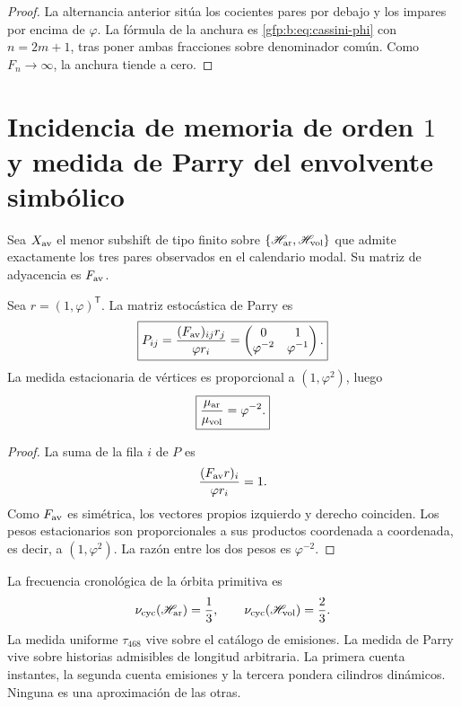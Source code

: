 \begin{proof}
La alternancia anterior sitúa los cocientes pares por debajo y los impares
por encima de \(\varphi\). La fórmula de la anchura es
\eqref{gfp:b:eq:cassini-phi} con \(n=2m+1\), tras poner ambas fracciones sobre
denominador común. Como \(F_n\to\infty\), la anchura tiende a cero.
\end{proof}

\section{Incidencia de memoria de orden \(1\) y medida de Parry del envolvente simbólico}

Sea \(X_{\rm av}\) el menor subshift de tipo finito sobre
\(\{\mathscr H_{\rm ar},\mathscr H_{\rm vol}\}\) que admite exactamente
los tres pares observados en el calendario modal. Su matriz de adyacencia es
\(F_{\rm av}\).

\begin{theorem}
\label{gfp:b:thm:parry-phi}
Sea \(r=(1,\varphi)^{\mathsf T}\). La matriz estocástica de Parry es
\begin{equation}
 \boxed{
 P_{ij}=
 \frac{(F_{\rm av})_{ij}r_j}{\varphi r_i}
 =
 \begin{pmatrix}
 0&1\\
 \varphi^{-2}&\varphi^{-1}
 \end{pmatrix}.}
 \label{gfp:b:eq:parry-matriz-phi}
\end{equation}
La medida estacionaria de vértices es proporcional a
\((1,\varphi^2)\), luego
\begin{equation}
 \boxed{
 \frac{\mu_{\rm ar}}{\mu_{\rm vol}}=\varphi^{-2}.}
 \label{gfp:b:eq:parry-razon-phi}
\end{equation}
\end{theorem}

\begin{proof}
La suma de la fila \(i\) de \(P\) es
\[
 \frac{(F_{\rm av}r)_i}{\varphi r_i}=1.
\]
Como \(F_{\rm av}\) es simétrica, los vectores propios izquierdo y derecho
coinciden. Los pesos estacionarios son proporcionales a sus productos
coordenada a coordenada, es decir, a \((1,\varphi^2)\). La razón entre los
dos pesos es \(\varphi^{-2}\).
\end{proof}

\begin{remark}
La frecuencia cronológica de la órbita primitiva es
\[
 \nu_{\rm cyc}(\mathscr H_{\rm ar})=\frac13,
 \qquad
 \nu_{\rm cyc}(\mathscr H_{\rm vol})=\frac23.
\]
La medida uniforme \(\tau_{468}\) vive sobre el catálogo de emisiones. La
medida de Parry vive sobre historias admisibles de longitud arbitraria. La
primera cuenta instantes, la segunda cuenta emisiones y la tercera pondera
cilindros dinámicos. Ninguna es una aproximación de las otras.
\end{remark}

